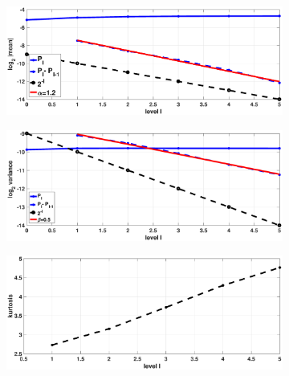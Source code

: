 \begin{figure}[htb]
	\centering %
	\begin{subfigure}{0.5\textwidth}
		\includegraphics[width=\linewidth]{./figures/MLMC_density_Heston_estimation/FT/density_option_set1_L_0_2_steps_L_5_N_10_5_bet_32/density_option_set1_L_0_2_steps_L_5_N_10_5_weak}
		\caption{}
		\label{fig:hest_density_weak_FT}
	\end{subfigure}\hfil %
	\begin{subfigure}{0.5\textwidth}
		\includegraphics[width=\linewidth]{./figures/MLMC_density_Heston_estimation/FT/density_option_set1_L_0_2_steps_L_5_N_10_5_bet_32/density_option_set1_L_0_2_steps_L_5_N_10_5_strong}
		\caption{}
		\label{fig:hest_density_strong_FT}
	\end{subfigure}\hfil %
	\begin{subfigure}{0.5\textwidth}
		\includegraphics[width=\linewidth]{./figures/MLMC_density_Heston_estimation/FT/density_option_set1_L_0_2_steps_L_5_N_10_5_bet_32/density_option_set1_L_0_2_steps_L_5_N_10_5_kurt}

\end{subfigure}
\end{figure}
